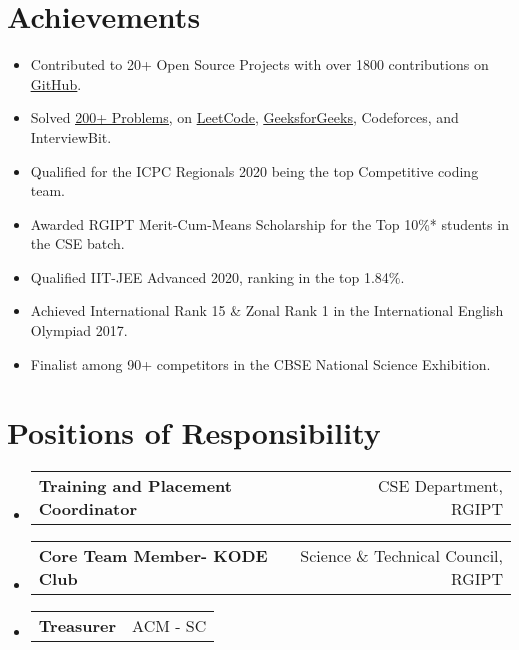 \documentclass[letterpaper,11pt]{article}
\makeatletter
\newcommand{\resumeItemWithoutTitle}[1]{
  \item\small{
  {#1 \vspace{-2pt}}
    {\vspace{-2pt}}
  }
}
\newcommand{\resumeSubheadingPOR}[2]{
 \vspace{-1pt}\item
    \begin{tabular*}{0.97\textwidth}{l@{\extracolsep{\fill}}r}
  \textbf{   #1} & #2 
    \end{tabular*}
  \vspace{-5pt}
}
\newcommand{\resumeSubHeadingListStart}{\begin{itemize}[leftmargin=*]}
\newcommand{\resumeSubHeadingListEnd}{\end{itemize}}
\makeatother
\begin{document}
\section{Achievements}
\resumeSubHeadingListStart
\resumeItemWithoutTitle
{Contributed to 20+ Open Source Projects with over 1800 contributions on  \href{https://github.com/ayushr1}{\underline{GitHub}}.}


\resumeItemWithoutTitle
{Solved \href{https://github.com/AyushR1/DSA-QA/}{\underline{200+ Problems}},  on 
\href{https://leetcode.com/AyushR1/}{\underline{LeetCode}}, 
\href{https://auth.geeksforgeeks.org/user/ayushr1_gfg}{\underline{GeeksforGeeks}}, Codeforces, and InterviewBit.}
\resumeItemWithoutTitle
{Qualified for the ICPC Regionals 2020 being the top Competitive coding team.} 
\resumeItemWithoutTitle
{Awarded RGIPT Merit-Cum-Means Scholarship for the Top 10\%* students in the CSE batch. }
\resumeItemWithoutTitle
{Qualified IIT-JEE Advanced 2020, ranking in the top 1.84\%.}
\resumeItemWithoutTitle
{Achieved International Rank 15 \& Zonal Rank 1 in the  International English Olympiad 2017.}
\resumeItemWithoutTitle
{Finalist among 90+ competitors in the CBSE National Science Exhibition.}
\resumeSubHeadingListEnd


\section{Positions of Responsibility}
  \resumeSubHeadingListStart
      \resumeSubheadingPOR
   {Training and Placement Coordinator}{CSE Department, RGIPT}
       \resumeSubheadingPOR
   {Core Team Member- KODE Club}{Science \& Technical Council, RGIPT}
       \resumeSubheadingPOR
   {Treasurer}{ACM - SC}
\resumeSubHeadingListEnd
\end{document}
